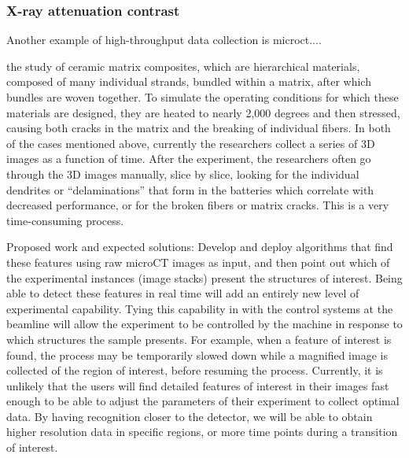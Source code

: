 \subsubsection{X-ray attenuation contrast}\label{subsec:microct}
Another example of high-throughput data collection is microct....


the study of ceramic matrix composites, which are hierarchical materials, composed of many individual strands, bundled within a matrix, after which bundles are woven together. To simulate the operating conditions for which these materials are designed, they are heated to nearly 2,000 degrees and then stressed, causing both cracks in the matrix and the breaking of individual fibers. In both of the cases mentioned above, currently the researchers collect a series of 3D images as a function of time. After the experiment, the researchers often go through the 3D images manually, slice by slice, looking for the individual dendrites or “delaminations” that form in the batteries which correlate with decreased performance, or for the broken fibers or matrix cracks. This is a very time-consuming process.

Proposed work and expected solutions: Develop and deploy algorithms that find these features using raw microCT images as input, and then point out which of the experimental instances (image stacks) present the structures of interest. Being able to detect these features in real time will add an entirely new level of experimental capability. Tying this capability in with the control systems at the beamline will allow the experiment to be controlled by the machine in response to which structures the sample presents. For example, when a feature of interest is found, the process may be temporarily slowed down while a magnified image is collected of the region of interest, before resuming the process. Currently, it is unlikely that the users will find detailed features of interest in their images fast enough to be able to adjust the parameters of their experiment to collect optimal data. By having recognition closer to the detector, we will be able to obtain higher resolution data in specific regions, or more time points during a transition of interest.


\cite{IEEEBigData:2014}


